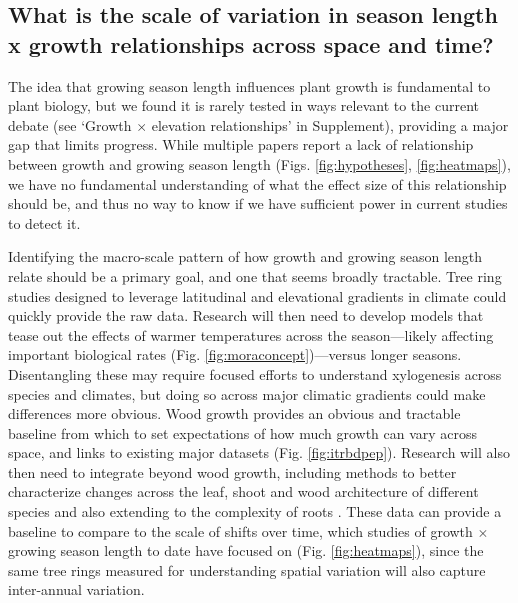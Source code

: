 \documentclass[11pt]{article}
\newcommand{\R}[1]{\label{#1}\linelabel{#1}}
\begin{document}

\subsection*{What is the scale of variation in season length x growth relationships across space and time?}

The idea that growing season length influences plant growth is fundamental to plant biology, but we found it is rarely tested in ways relevant to the current debate (see `Growth $\times$ elevation relationships' in Supplement), providing a major gap that limits progress. While multiple papers report a lack of relationship between growth and growing season length (Figs. \ref{fig:hypotheses}, \ref{fig:heatmaps}), we have no fundamental understanding of what the effect size of this relationship should be, and thus no way to know if we have sufficient power in current studies to detect it. %

Identifying the macro-scale pattern of how growth and growing season length relate should be a primary goal, and one that seems broadly tractable. \R{R2rate2S}Tree ring studies designed to leverage latitudinal and elevational gradients in climate could quickly provide the raw data. Research will then need to develop models that tease out the effects of warmer temperatures across the season---likely affecting important biological rates  (Fig. \ref{fig:moraconcept})---versus longer seasons. Disentangling these may require focused efforts to understand xylogenesis across species and climates, but doing so across major climatic gradients could make differences more obvious.\R{R2rate2E} Wood growth provides an obvious and tractable baseline from which to set expectations of how much growth can vary across space, and links to existing major datasets (Fig. \ref{fig:itrbdpep}).  Research will also then need to integrate beyond wood growth, including methods to better characterize changes across the leaf, shoot and wood architecture of different species \citep[e.g.][]{puletti2020lidar,sillett2024ground} and also extending to the complexity of roots \citep{mckown2016impacts,radville2016}. These data can provide a baseline to compare to the scale of shifts over time, which studies of growth $\times$ growing season length to date have focused on (Fig. \ref{fig:heatmaps}), since the same tree rings measured for understanding spatial variation will also capture inter-annual variation. 
\end{document}
